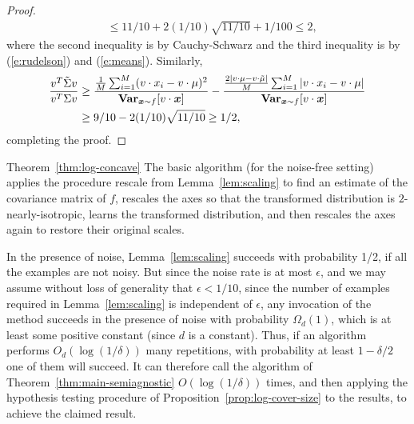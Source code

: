\begin{proof}
\begin{align*}
  & \leq 11/10 + 2 (1/10) \sqrt{11/10} + 1/100 \leq 2,
\end{align*}
where the second inequality is by Cauchy-Schwarz and the third inequality is
by (\ref{e:rudelson}) and (\ref{e:means}).
Similarly, 
\begin{align*}
\frac{v^T \tilde{\Sigma} v}{v^T \Sigma v}
  & \geq \frac{\frac{1}{M} \sum_{i=1}^{M} (v \cdot x_i - v \cdot \mu)^2}
           {\operatorname{{\bf Var}}_{\boldsymbol{x} \sim f} [v \cdot \boldsymbol{x}]} 
           - \frac{\frac{2 |v \cdot \mu - v \cdot \tilde{\mu}|}{M} \sum_{i=1}^{M} |v \cdot x_i - v \cdot \mu|}
           {\operatorname{{\bf Var}}_{\boldsymbol{x} \sim f} [v \cdot \boldsymbol{x}]} 
                \\
  & \geq 9/10 - 2 (1/10) \sqrt{11/10} \geq 1/2,
\end{align*}
completing the proof.
\end{proof}

\medskip

\begin{proofof}{Theorem~\ref{thm:log-concave}}
The basic algorithm (for the noise-free setting) applies the procedure \textsf{rescale} from Lemma~\ref{lem:scaling} to find
an estimate of the covariance matrix of $f$, rescales the axes so that the transformed distribution
is $2$-nearly-isotropic, learns the transformed distribution, and then rescales the axes again to restore their
original scales.

In the presence of noise, Lemma~\ref{lem:scaling} succeeds with probability 1/2, if all the examples
are not noisy.  But since the noise rate is at most $\epsilon$, and we may assume without loss of
generality that $\epsilon < 1/10$, since the number of examples required in Lemma~\ref{lem:scaling}
is independent of $\epsilon$, any invocation of the method succeeds in the presence of noise
with probability $\Omega_d(1)$, which is at least some positive constant (since $d$ is a constant).  
Thus, if an algorithm performs
$O_d(\log(1/\delta))$ many repetitions, with probability at least $1 - \delta/2$ one of them will succeed.
It can therefore call the algorithm of Theorem~\ref{thm:main-semiagnostic}
$O(\log(1/\delta))$ times, and then applying the hypothesis testing procedure of
Proposition~\ref{prop:log-cover-size} to the results, to achieve the claimed result.
\end{proofof}
